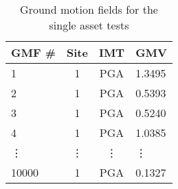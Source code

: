 \begin{table}[htbp]

\centering
\begin{tabular}{ l c c l }

\hline
\rowcolor{anti-flashwhite}
\bf{GMF #} & \bf{Site} & \bf{IMT} & \bf{GMV}\\
\hline
1 & 1 & PGA & 1.3495 \\
2 & 1 & PGA & 0.5393 \\
3 & 1 & PGA & 0.5240 \\
4 & 1 & PGA & 1.0385 \\
\vdots & \vdots & \vdots & \vdots \\
10000 & 1 & PGA & 0.1327 \\
\hline
\end{tabular}

\caption{Ground motion fields for the single asset tests}
\label{tab:scenario-gmfs-single}
\end{table}